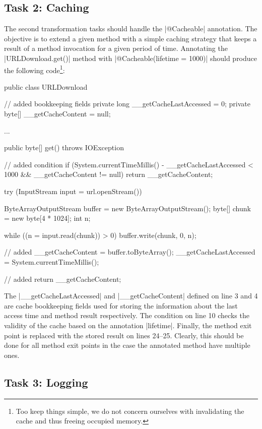 \subsection{Task 2: Caching}

The second transformation tasks should handle the \javainline|@Cacheable| annotation.
The objective is to extend a given method with a simple caching strategy that keeps a result of a method invocation for a given period of time.
Annotating the \javainline|URLDownload.get()| method with \javainline|@Cacheable(lifetime = 1000)| should produce the following code\footnote{Too keep things simple, we do not concern ourselves with invalidating the cache and thus freeing occupied memory.}:
%
\begin{javacode}
public class URLDownload {
  // added bookkeeping fields
  private long __getCacheLastAccessed = 0;
  private byte[] __getCacheContent = null;

  ...

  public byte[] get() throws IOException {
    // added condition
    if (System.currentTimeMillis() - __getCacheLastAccessed < 1000 && __getCacheContent != null) {
      return __getCacheContent;
    }

    try (InputStream input = url.openStream()) {
      ByteArrayOutputStream buffer = new ByteArrayOutputStream();
      byte[] chunk = new byte[4 * 1024];
      int n;

      while ((n = input.read(chunk)) > 0) {
        buffer.write(chunk, 0, n);
      }

      // added
      __getCacheContent = buffer.toByteArray();
      __getCacheLastAccessed = System.currentTimeMillis();
      
      // added
      return __getCacheContent;
    }
  }
}
\end{javacode}

The \javainline|__getCacheLastAccessed| and \javainline|__getCacheContent| defined on line 3 and 4 are cache bookkeeping fields used for storing the information about the last access time and method result respectively.
The condition on line 10 checks the validity of the cache based on the annotation \javainline|lifetime|.
Finally, the method exit point is replaced with the stored result on lines 24--25.
Clearly, this should be done for all method exit points in the case the annotated method have multiple ones.

\subsection{Task 3: Logging}

